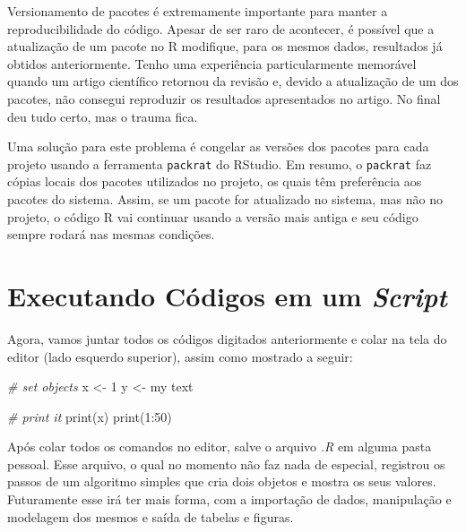 \documentclass[
  11pt,
]{book}
\newenvironment{Shaded}{\begin{snugshade}}{\end{snugshade}}
\newcommand{\CommentTok}[1]{\textcolor[rgb]{0.37,0.37,0.37}{\textit{#1}}}
\newcommand{\DecValTok}[1]{\textcolor[rgb]{0.06,0.06,0.06}{#1}}
\newcommand{\FunctionTok}[1]{\textcolor[rgb]{0,0,0}{#1}}
\newcommand{\NormalTok}[1]{#1}
\newcommand{\OtherTok}[1]{\textcolor[rgb]{0.37,0.37,0.37}{#1}}
\newcommand{\SpecialCharTok}[1]{\textcolor[rgb]{0,0,0}{#1}}
\newcommand{\StringTok}[1]{\textcolor[rgb]{0.5,0.5,0.5}{#1}}
\newenvironment{rmdimportant}
{\begin{importantblock}

	} {\end{importantblock}}
\begin{document}
\begin{rmdimportant}
Versionamento de pacotes é extremamente importante para manter a
reproducibilidade do código. Apesar de ser raro de acontecer, é possível
que a atualização de um pacote no R modifique, para os mesmos dados,
resultados já obtidos anteriormente. Tenho uma experiência
particularmente memorável quando um artigo científico retornou da
revisão e, devido a atualização de um dos pacotes, não consegui
reproduzir os resultados apresentados no artigo. No final deu tudo
certo, mas o trauma fica.

Uma solução para este problema é congelar as versões dos pacotes para
cada projeto usando a ferramenta \texttt{packrat} do RStudio. Em resumo,
o \texttt{packrat} faz cópias locais dos pacotes utilizados no projeto,
os quais têm preferência aos pacotes do sistema. Assim, se um pacote for
atualizado no sistema, mas não no projeto, o código R vai continuar
usando a versão mais antiga e seu código sempre rodará nas mesmas
condições.
\end{rmdimportant}

\hypertarget{executando-cuxf3digos-em-um-script}{%
\section{\texorpdfstring{Executando Códigos em um \emph{Script}}{Executando Códigos em um Script}}\label{executando-cuxf3digos-em-um-script}}

Agora, vamos juntar todos os códigos digitados anteriormente e colar na tela do editor (lado esquerdo superior), assim como mostrado a seguir:

\begin{Shaded}
\begin{Highlighting}[]
\CommentTok{\# set objects}
\NormalTok{x }\OtherTok{\textless{}{-}} \DecValTok{1}
\NormalTok{y }\OtherTok{\textless{}{-}} \StringTok{\textquotesingle{}my text\textquotesingle{}}

\CommentTok{\# print it}
\FunctionTok{print}\NormalTok{(x)}
\FunctionTok{print}\NormalTok{(}\DecValTok{1}\SpecialCharTok{:}\DecValTok{50}\NormalTok{)}
\end{Highlighting}
\end{Shaded}

Após colar todos os comandos no editor, salve o arquivo \emph{.R} em alguma pasta pessoal. Esse arquivo, o qual no momento não faz nada de especial, registrou os passos de um algoritmo simples que cria dois objetos e mostra os seus valores. Futuramente esse irá ter mais forma, com a importação de dados, manipulação e modelagem dos mesmos e saída de tabelas e figuras.
\end{document}
